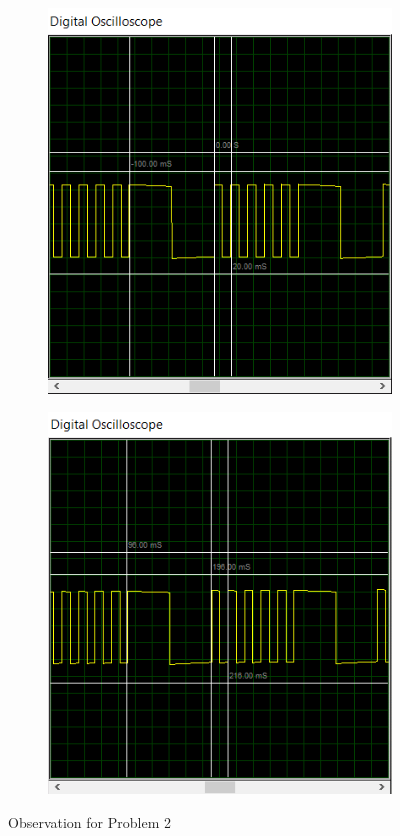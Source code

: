 \documentclass{lab_sheet}
\begin{document}
\begin{figure}[H]
\begin{subfigure}{.5\textwidth}
            \caption{}
            \label{fig:prob2_b}
            \end{subfigure}
            \newline
            \begin{subfigure}{.5\textwidth}
                \centering
                \includegraphics[width=.8\linewidth,frame]{../Figures/2c.png}
                \caption{}
                \label{fig:prob2_c}
                \end{subfigure}
                \begin{subfigure}{.5\textwidth}
                    \centering
                    \includegraphics[width=.8\linewidth,frame]{../Figures/2d.png}
                    \caption{}
                    \label{fig:prob2_d}
                    \end{subfigure}
                    \caption{Observation for Problem 2}
                    \label{fig:prob2}
    \end{figure}
\end{document}
